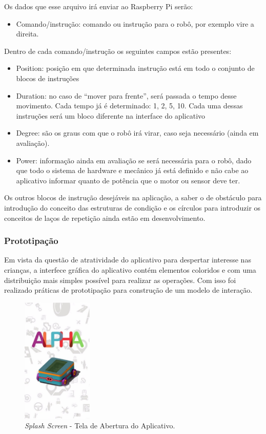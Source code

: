 

Os dados que esse arquivo irá enviar ao Raspberry Pi serão:
\begin{itemize}
	\item Comando/instrução: comando ou instrução para o robô, por exemplo vire a direita.
\end{itemize}

Dentro de cada comando/instrução os seguintes campos estão presentes:
\begin{itemize}
\item Position: posição em que determinada instrução está em todo o conjunto de blocos de instruções
\item Duration: no caso de “mover para frente”, será passada o tempo desse movimento. Cada tempo já é determinado: 1, 2, 5, 10. Cada uma dessas instruções será um bloco diferente na interface do aplicativo
\item Degree: são os graus com que o robô irá virar, caso seja necessário (ainda em avaliação).
\item Power: informação ainda em avaliação se será necessária para o robô, dado que todo o sistema de hardware e mecânico já está definido e não cabe ao aplicativo informar quanto de potência que o motor ou sensor deve ter.
\end{itemize}

Os outros blocos de instrução desejáveis na aplicação, a saber o de obstáculo para introdução do conceito das estruturas de condição e os círculos para introduzir os conceitos de laços de repetição ainda estão em desenvolvimento.

\subsubsection{Prototipação}

Em vista da questão de atratividade do aplicativo para despertar interesse nas crianças, a interfece gráfica do aplicativo contém elementos
coloridos e com uma distribuição mais simples possível para realizar as operações. Com isso foi realizado práticas de prototipação para construção
de um modelo de interação.

\begin{figure}[H]
    \centering
    \includegraphics[width=0.3\textwidth]{figuras/splash_screen.eps}
    \caption{\textit{Splash Screen} - Tela de Abertura do Aplicativo.}
    \label{fig:splash_screen}
\end{figure}

